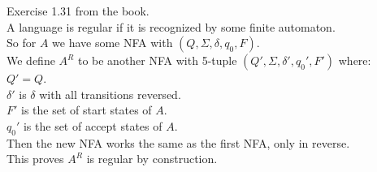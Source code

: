 \begin{problem}{7} Exercise 1.31 from the book. \\

\noindent A language is regular if it is recognized by some finite automaton. \\

\noindent So for $A$ we have some NFA with $(Q, \Sigma, \delta, q_0, F)$. \\

\noindent We define $A^R$ to be another NFA with 5-tuple $(Q', \Sigma, \delta', q_0', F')$ where: \\
$Q' = Q$. \\
$\delta'$ is $\delta$ with all transitions reversed. \\
$F'$ is the set of start states of $A$. \\
$q_0'$ is the set of accept states of $A$. \\

\noindent Then the new NFA works the same as the first NFA, only in reverse. \\

\noindent This proves $A^R$ is regular by construction. \\

\end{problem}
